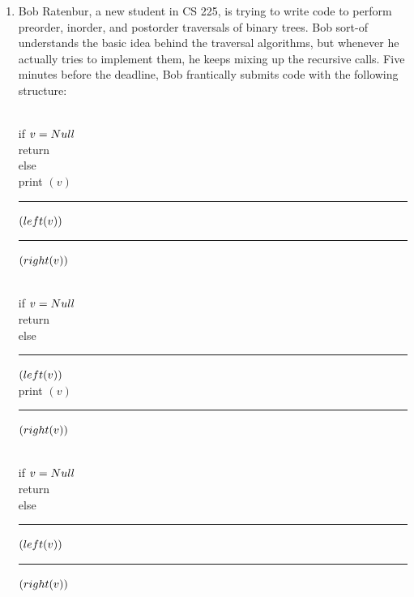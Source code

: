 \begin{exercises}
\begin{enumerate}[label=\arabic*.,ref=\thechapter.\arabic*,leftmargin=*,align=left,itemsep=1.5ex plus 0.5ex,resume]
\begin{enumerate}
\end{enumerate}
\item {} Bob Ratenbur, a new student in CS 225, is trying to write code to perform preorder, inorder, and postorder traversals of binary trees. Bob sort-of understands the basic idea behind the traversal algorithms, but whenever he actually tries to implement them, he keeps mixing up the recursive calls. Five minutes before the deadline, Bob frantically submits code with the following structure:
\begin{center}
\setlength{\fboxsep}{2pt}
\begin{minipage}[t]{0.33\linewidth}
\begin{pseudocode}
\footnotesize{}\\
if $v = Null$\\
\Indent return\\
else\\
\Indent print $(v)$\\
\Indent \rule{1.5em}{1.4ex}$(left(v))$\\
\Indent \rule{1.5em}{1.4ex}$(right(v))$
\end{pseudocode}
\end{minipage}\hfill
\begin{minipage}[t]{0.33\linewidth}
\begin{pseudocode}
\footnotesize{}\\
if $v = Null$\\
\Indent return\\
else\\
\Indent \rule{1.5em}{1.4ex}$(left(v))$\\
\Indent print $(v)$\\
\Indent \rule{1.5em}{1.4ex}$(right(v))$
\end{pseudocode}
\end{minipage}\hfill
\begin{minipage}[t]{0.33\linewidth}
\begin{pseudocode}
\footnotesize{}\\
if $v = Null$\\
\Indent return\\
else\\
\Indent \rule{1.5em}{1.4ex}$(left(v))$\\
\Indent \rule{1.5em}{1.4ex}$(right(v))$\\

\end{pseudocode}
\end{minipage}
\end{center}
\end{enumerate}
\end{exercises}
